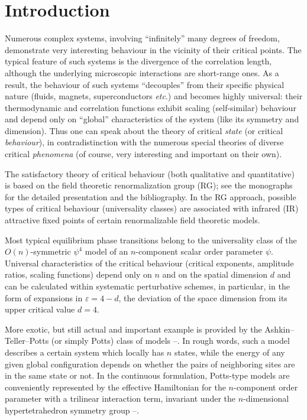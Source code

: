 \documentclass[12pt]{iopart}
\begin{document}
\section{Introduction} \label{sec:Intro}


Numerous complex systems, involving ``infinitely'' many degrees of
freedom, demonstrate very interesting behaviour in the vicinity of
their critical points. The typical feature of such systems is the
divergence of the correlation length, although the underlying
microscopic interactions are short-range ones. As a result, the
behaviour of such systems ``decouples'' from their specific
physical nature (fluids, magnets, superconductors {\it etc}.) and
becomes highly universal: their thermodynamic and correlation
functions exhibit scaling (self-similar) behaviour and depend only
on ``global'' characteristics of the system (like its symmetry and
dimension). Thus one can speak about the theory of critical {\it
state} (or critical {\it behaviour}), in contradistinction with
the numerous special theories of diverse critical {\it phenomena}
(of course, very interesting and important on their own).


The satisfactory theory of critical behaviour (both qualitative and
quantitative) is based on the field theoretic renormalization group (RG);
see the monographs \cite{Zinn,Book3} for the detailed presentation and the
bibliography. In the RG approach, possible types of critical behaviour
(universality classes) are associated with infrared (IR) attractive fixed
points of certain renormalizable field theoretic models.


Most typical equilibrium phase transitions belong to the universality class
of the $O(n)$-symmetric $\psi^{4}$ model of an $n$-component scalar order
parameter $\psi$. Universal characteristics of the critical behaviour
(critical exponents, amplitude ratios, scaling functions) depend only on
$n$ and on the spatial dimension $d$ and can be calculated within systematic
perturbative schemes, in particular, in the form of expansions in
$\varepsilon=4-d$, the deviation of the space dimension from its upper
critical value $d=4$.


More exotic, but still actual and important example is provided by the
Ashkin--Teller--Potts (or simply Potts) class of models
\cite{ATP}--\cite{Bonfim}. In rough words, such a model describes a certain
system which locally has $n$ states, while the energy of any given global
configuration depends on whether the pairs of neighboring sites are in the
same state or not. In the continuous formulation, Potts-type models are
conveniently represented by the effective Hamiltonian for the $n$-component
order parameter with a trilinear interaction term, invariant under the
$n$-dimensional hypertetrahedron symmetry group \cite{Golner}--\cite{Bonfim}.
\end{document}
